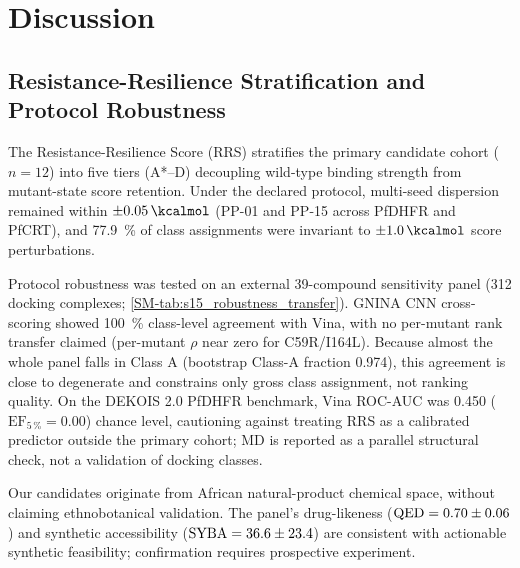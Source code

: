 \documentclass[journal=jcisd8,manuscript=article,layout=traditional]{achemso}
\begin{document}

\section{Discussion}

\subsection{Resistance-Resilience Stratification and Protocol Robustness}

The Resistance-Resilience Score (RRS) stratifies the primary candidate cohort ($n=\num{12}$) into five tiers (A*--D) decoupling wild-type binding strength from mutant-state score retention. Under the declared protocol, multi-seed dispersion remained within $\pm\qty{0.05}{\kcalmol}$ (PP-01 and PP-15 across PfDHFR and PfCRT), and \qty{77.9}{\percent} of class assignments were invariant to $\pm\qty{1.0}{\kcalmol}$ score perturbations.

Protocol robustness was tested on an external 39-compound sensitivity panel (\num{312} docking complexes; \cref{SM-tab:s15_robustness_transfer}). GNINA CNN cross-scoring showed \qty{100}{\percent} class-level agreement with Vina, with no per-mutant rank transfer claimed (per-mutant $\rho$ near zero for C59R/I164L). Because almost the whole panel falls in Class A (bootstrap Class-A fraction \num{0.974}), this agreement is close to degenerate and constrains only gross class assignment, not ranking quality. On the DEKOIS 2.0 PfDHFR benchmark, Vina ROC-AUC was \num{0.450} ($\mathrm{EF}_{5\,\%} = \num{0.00}$) chance level, cautioning against treating RRS as a calibrated predictor outside the primary cohort; MD is reported as a parallel structural check, not a validation of docking classes.

Our candidates originate from African natural-product chemical space, without claiming ethnobotanical validation. The panel's drug-likeness ($\mathrm{QED} = \num{0.70 \pm 0.06}$) and synthetic accessibility ($\mathrm{SYBA} = \num{36.6 \pm 23.4}$) are consistent with actionable synthetic feasibility; confirmation requires prospective experiment.
\end{document}

